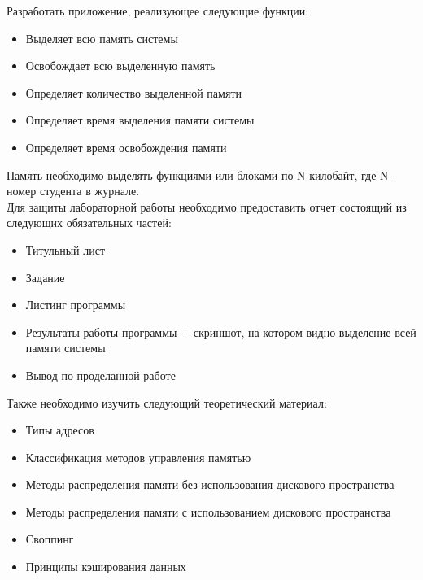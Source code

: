 \documentclass[a4paper,12pt]{article}
\begin{document}
  
  \begin{flushleft}
    Разработать приложение, реализующее следующие функции:
    \begin{itemize}
      \item Выделяет всю память системы
      \item Освобождает всю выделенную память
      \item Определяет количество выделенной памяти
      \item Определяет время выделения памяти системы
      \item Определяет время освобождения памяти
    \end{itemize}
  \end{flushleft}
  
  Память необходимо выделять функциями  или  блоками по N килобайт, где N - номер студента в журнале. \\
  
  Для защиты лабораторной работы необходимо предоставить отчет состоящий из следующих обязательных частей:
  \begin{itemize}
    \item Титульный лист
    \item Задание
    \item Листинг программы
    \item Результаты работы программы + скриншот, на котором видно выделение всей памяти системы
    \item Вывод по проделанной работе
  \end{itemize}
  
  Также необходимо изучить следующий теоретический материал:
  \begin{itemize}
    \item Типы адресов
    \item Классификация методов управления памятью
    \item Методы распределения памяти без использования дискового пространства
    \item Методы распределения памяти с использованием дискового пространства
    \item Своппинг
    \item Принципы кэширования данных
  \end{itemize}
\end{document}
